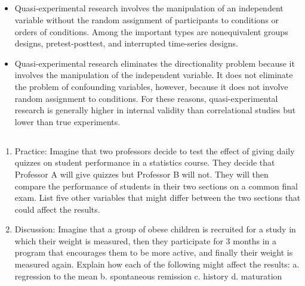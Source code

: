 \subsection{}

\begin{fullwidth}

\begin{itemize}


\item Quasi-experimental research involves the manipulation of an independent variable without the random assignment of participants to conditions or orders of conditions. Among the important types are nonequivalent groups designs, pretest-posttest, and interrupted time-series designs.

\item Quasi-experimental research eliminates the directionality problem because it involves the manipulation of the independent variable. It does not eliminate the problem of confounding variables, however, because it does not involve random assignment to conditions. For these reasons, quasi-experimental research is generally higher in internal validity than correlational studies but lower than true experiments.


\end{itemize}

\end{fullwidth}



\subsection{}

\begin{fullwidth}

\begin{enumerate}

\item  Practice: Imagine that two professors decide to test the effect of giving daily quizzes on student performance in a statistics course. They decide that Professor A will give quizzes but Professor B will not. They will then compare the performance of students in their two sections on a common final exam. List five other variables that might differ between the two sections that could affect the results.

\item Discussion: Imagine that a group of obese children is recruited for a study in which their weight is measured, then they participate for 3 months in a program that encourages them to be more active, and finally their weight is measured again. Explain how each of the following might affect the results:
a. regression to the mean b. spontaneous remission c. history
d. maturation


\end{enumerate}

\end{fullwidth}  

